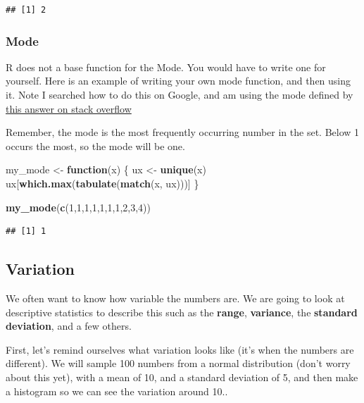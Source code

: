 \documentclass[]{book}
\newenvironment{Shaded}{\begin{snugshade}}{\end{snugshade}}
\newcommand{\KeywordTok}[1]{\textcolor[rgb]{0.13,0.29,0.53}{\textbf{#1}}}
\newcommand{\DecValTok}[1]{\textcolor[rgb]{0.00,0.00,0.81}{#1}}
\newcommand{\StringTok}[1]{\textcolor[rgb]{0.31,0.60,0.02}{#1}}
\newcommand{\ControlFlowTok}[1]{\textcolor[rgb]{0.13,0.29,0.53}{\textbf{#1}}}
\newcommand{\NormalTok}[1]{#1}
\begin{document}
\begin{verbatim}
## [1] 2
\end{verbatim}

\subsubsection{Mode}\label{mode}

R does not a base function for the Mode. You would have to write one for
yourself. Here is an example of writing your own mode function, and then
using it. Note I searched how to do this on Google, and am using the
mode defined by
\href{https://stackoverflow.com/questions/2547402/is-there-a-built-in-function-for-finding-the-mode}{this
answer on stack overflow}

Remember, the mode is the most frequently occurring number in the set.
Below 1 occurs the most, so the mode will be one.

\begin{Shaded}
\begin{Highlighting}[]
\NormalTok{my_mode <-}\StringTok{ }\ControlFlowTok{function}\NormalTok{(x) \{}
\NormalTok{  ux <-}\StringTok{ }\KeywordTok{unique}\NormalTok{(x)}
\NormalTok{  ux[}\KeywordTok{which.max}\NormalTok{(}\KeywordTok{tabulate}\NormalTok{(}\KeywordTok{match}\NormalTok{(x, ux)))]}
\NormalTok{\}}

\KeywordTok{my_mode}\NormalTok{(}\KeywordTok{c}\NormalTok{(}\DecValTok{1}\NormalTok{,}\DecValTok{1}\NormalTok{,}\DecValTok{1}\NormalTok{,}\DecValTok{1}\NormalTok{,}\DecValTok{1}\NormalTok{,}\DecValTok{1}\NormalTok{,}\DecValTok{1}\NormalTok{,}\DecValTok{2}\NormalTok{,}\DecValTok{3}\NormalTok{,}\DecValTok{4}\NormalTok{))}
\end{Highlighting}
\end{Shaded}

\begin{verbatim}
## [1] 1
\end{verbatim}

\subsection{Variation}\label{variation}

We often want to know how variable the numbers are. We are going to look
at descriptive statistics to describe this such as the \textbf{range},
\textbf{variance}, the \textbf{standard deviation}, and a few others.

First, let's remind ourselves what variation looks like (it's when the
numbers are different). We will sample 100 numbers from a normal
distribution (don't worry about this yet), with a mean of 10, and a
standard deviation of 5, and then make a histogram so we can see the
variation around 10..
\end{document}
